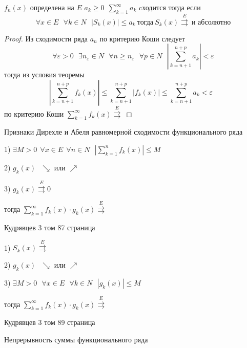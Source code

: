 \begin{block}
  $f_n(x)$ определена на $E$ $a_k \ge 0 ~~ \sum_{k=1}^{\infty}a_k$ cходится
  тогда если
  $$
  \forall x \in E ~~~ \forall k \in N~~~ |S_k(x)| \le a_k ~ \text{тогда} ~
  S_k (x) \stackrel{E}{\rightrightarrows} ~ \text{и абсолютно}
  $$
\end{block}

\begin{proof}
  Из сходимости ряда $a_n$ по критерию Коши следует
  $$
  \forall \varepsilon > 0 ~~~ \exists n_{\varepsilon} \in N ~~~ \forall n \ge
  n_{\varepsilon} ~~~ \forall p \in N ~~~ \left| \sum_{k=n+1}^{n+p} a_k \right|
  < \varepsilon
  $$
  тогда из условия теоремы
  $$
  \left| \sum_{k = n + 1}^{n+p} f_k(x) \right| \le
  \sum_{k = n + 1}^{n+p} |f_k(x)| \le \sum_{k = n+1}^{n+p} a_k < \varepsilon ~~~
  $$
  по критерию Коши $\sum_{k=1}^{\infty} f_k(x) \stackrel{E}{\rightrightarrows}$
\end{proof}

\begin{title}[\Large]
  Признаки Дирехле и Абеля равномерной сходимости функционального ряда
\end{title}

\begin{block}
  1)
  $
  \exists M > 0 ~~ \forall x \in E ~~ \forall n \in N ~~~
  \left| \sum_{k=1}^n f_k(x) \right| \le M
  $

  2) $g_k(x) ~~~ \searrow$ или $\nearrow$

  3) $g_k(x) \stackrel{E}{\rightrightarrows} 0$

  тогда $\sum_{k=1}^{\infty} f_k(x) \cdot g_k(x)\stackrel{E}{\rightrightarrows}$

  Кудрявцев 3 том 87 страница
\end{block}

\begin{block}
  1) $S_k(x) \stackrel{E}{\rightrightarrows}$

  2) $g_k(x) ~~~ \searrow$ или $\nearrow$

  3) $\exists M > 0 ~~~ \forall x \in E ~~~ \forall k \in N ~~~ |g_k(x)| \le M$

  тогда $\sum_{k=1}^{\infty} f_k(x) \cdot g_k(x)\stackrel{E}{\rightrightarrows}$

  Кудрявцев 3 том 89 страница
\end{block}

\begin{title}[\Large]
  Непрерывность суммы функционального ряда
\end{title}


